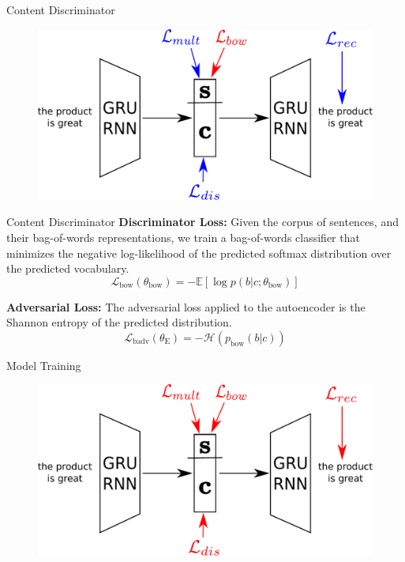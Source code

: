 \documentclass[aspectratio=169]{beamer}
\newcommand{\loss}[1]{\mathcal{L}_{\text{#1}}}
\newcommand{\param}[1]{\theta_{\text{#1}}}
\begin{document}
\begin{frame}{Content Discriminator}
	\centering
	\begin{figure}[ht]
		\includegraphics[width=\textwidth]{images/overview-training-4}
	\end{figure}
\end{frame}

\begin{frame}{Content Discriminator}
	\textbf{Discriminator Loss:}
	Given the corpus of sentences, and their bag-of-words representations, we train a bag-of-words classifier that minimizes the negative log-likelihood of the predicted softmax distribution over the predicted vocabulary.
	\begin{equation} \label{eqn:bow-disc-loss}
		\loss{bow}(\param{bow}) = - \mathbb{E} [\log p(b|c;\param{bow})]
	\end{equation}

	\textbf{Adversarial Loss:}
	The adversarial loss applied to the autoencoder is the Shannon entropy of the predicted distribution.
	\begin{equation}
		\loss{badv}(\param{E}) = - \mathcal{H}(p_\text{bow}(b|c))
	\end{equation}
\end{frame}

\begin{frame}{Model Training}
	\centering
	\begin{figure}[ht]
		\includegraphics[width=\textwidth]{images/overview-training-all}
	\end{figure}
\end{frame}
\end{document}
